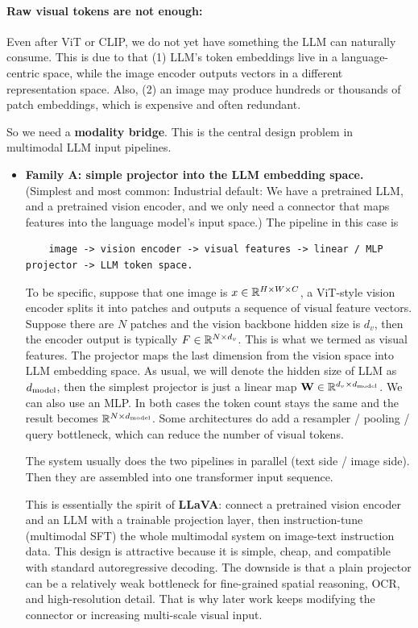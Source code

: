 \documentclass[11pt]{article}  %
\begin{document}
\paragraph{Raw visual tokens are not enough:}
Even after ViT or CLIP, we do not yet have something the LLM can naturally consume.
This is due to that (1) LLM's token embeddings live in a language-centric space, while the image encoder outputs vectors in a different representation space.
Also, (2) an image may produce hundreds or thousands of patch embeddings, which is expensive and often redundant.

So we need a \textbf{modality bridge}.
This is the central design problem in multimodal LLM input pipelines.

\begin{itemize}
  \item \textbf{Family A: simple projector into the LLM embedding space.} (Simplest and most common: Industrial default: We have a pretrained LLM, and a pretrained vision encoder, and we only need a connector that maps features into the language model's input space.) 
  The pipeline in this case is 
  \begin{lstlisting}
    image -> vision encoder -> visual features -> linear / MLP projector -> LLM token space.
  \end{lstlisting}
  To be specific, suppose that one image is $x \in \mathbb{R}^{H \times W \times C}$, a ViT-style vision encoder splits it into patches and outputs a sequence of visual feature vectors.
  Suppose there are $N$ patches and the vision backbone hidden size is $d_v$, then the encoder output is typically $F \in \mathbb{R}^{N \times d_v}$. 
  This is what we termed as visual features. 
  The projector maps the last dimension from the vision space into LLM embedding space.
  As usual, we will denote the hidden size of LLM as $d_{\text{model}}$, then the simplest projector is just a linear map $\mathbf{W} \in \mathbb{R}^{d_v \times d_{\text{model}}}$.
  We can also use an MLP.
  In both cases the token count stays the same and the result becomes $\mathbb{R}^{N \times d_{\text{model}}}$.
  Some architectures do add a resampler / pooling / query bottleneck, which can reduce the number of visual tokens.

  The system usually does the two pipelines in parallel (text side / image side). Then they are assembled into one transformer input sequence.

  This is essentially the spirit of \textbf{LLaVA}: connect a pretrained vision encoder and an LLM with a trainable projection layer, then instruction-tune (multimodal SFT) the whole multimodal system on image-text instruction data.
  This design is attractive because it is simple, cheap, and compatible with standard autoregressive decoding. The downside is that a plain projector can be a relatively weak bottleneck for fine-grained spatial reasoning, OCR, and high-resolution detail. That is why later work keeps modifying the connector or increasing multi-scale visual input.


\end{itemize}
\end{document}
